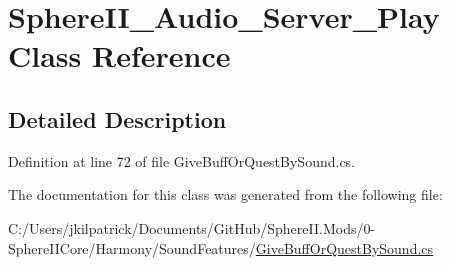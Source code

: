 \hypertarget{class_sphere_i_i___audio___server___play}{}\section{Sphere\+I\+I\+\_\+\+Audio\+\_\+\+Server\+\_\+\+Play Class Reference}
\label{class_sphere_i_i___audio___server___play}


\subsection{Detailed Description}


Definition at line 72 of file Give\+Buff\+Or\+Quest\+By\+Sound.\+cs.



The documentation for this class was generated from the following file\+:\begin{DoxyCompactItemize}
\item 
C\+:/\+Users/jkilpatrick/\+Documents/\+Git\+Hub/\+Sphere\+I\+I.\+Mods/0-\/\+Sphere\+I\+I\+Core/\+Harmony/\+Sound\+Features/\mbox{\hyperlink{_give_buff_or_quest_by_sound_8cs}{Give\+Buff\+Or\+Quest\+By\+Sound.\+cs}}\end{DoxyCompactItemize}

